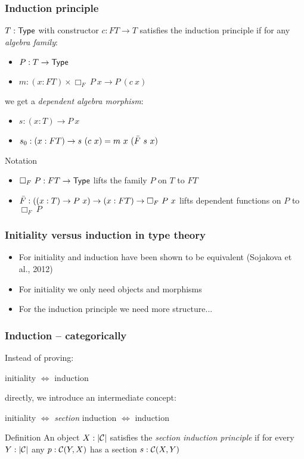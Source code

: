 \documentclass{beamer}
\begin{document}
\begin{frame}
  \frametitle{Induction principle}
  $T : \mathsf{Type}$ with constructor $c : FT \to T$ satisfies the
  induction principle if for any \emph{algebra family}:

  \begin{itemize}
  \item $P : T \to \mathsf{Type}$
  \item $m : (x : FT) \times \Box_F\ P\ x \to P\ (c\ x)$
  \end{itemize}

  we get a \emph{dependent algebra morphism}:

  \begin{itemize}
  \item $s : (x : T) \to P\ x$
  \item $s_0 : (x : FT) \to s\ (c\ x) = m\ x\ (\actionsection{F}\ s\ x)$
  \end{itemize}

  \begin{block}{Notation}
    \begin{itemize}
    \item $\Box_F\ P : FT \to \mathsf{Type}$ lifts the family $P$ on $T$ to
      $FT$
    \item
      $\bar{F} : ((x : T) \to P\ x) \to (x : FT) \to \Box_F\
      P\ x$ lifts dependent functions on $P$ to $\Box_F\ P$
    \end{itemize}
  \end{block}
\end{frame}

\begin{frame}
  \frametitle{Initiality versus induction in type theory}
  \begin{itemize}
  \item For \oits initiality and induction have been shown to be
    equivalent (Sojakova et al., 2012)
  \item For initiality we only need objects and morphisms
  \item For the induction principle we need more structure...
  \end{itemize}
\end{frame}

\begin{frame}
  \frametitle{Induction -- categorically}
  Instead of proving:
  \begin{center}
    initiality $\iff$ induction
  \end{center}
  directly, we introduce an intermediate concept:
  \begin{center}
    initiality $\iff$ \emph{section} induction $\iff$ induction
  \end{center}
  \hfill

  \begin{block}{Definition}
    An object $X : | \mathcal{C} |$ satisfies the \emph{section induction
      principle} if for every $Y : | \mathcal{C} |$ any $p : \mathcal{C}(Y,X)$ has a
    section $s : \mathcal{C}(X,Y)$
  \end{block}
\end{frame}
\end{document}
